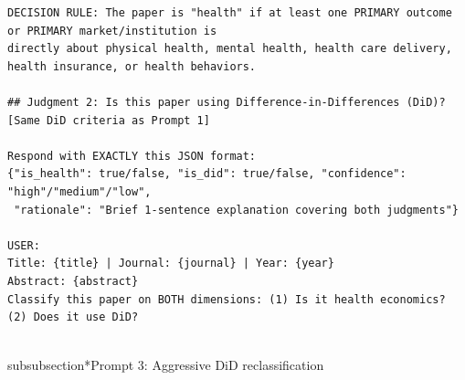 \begin{tcolorbox}[colback=gray!5, colframe=gray!60, breakable]
\begin{verbatim}
DECISION RULE: The paper is "health" if at least one PRIMARY outcome or PRIMARY market/institution is
directly about physical health, mental health, health care delivery, health insurance, or health behaviors.

## Judgment 2: Is this paper using Difference-in-Differences (DiD)?
[Same DiD criteria as Prompt 1]

Respond with EXACTLY this JSON format:
{"is_health": true/false, "is_did": true/false, "confidence": "high"/"medium"/"low",
 "rationale": "Brief 1-sentence explanation covering both judgments"}

USER:
Title: {title} | Journal: {journal} | Year: {year}
Abstract: {abstract}
Classify this paper on BOTH dimensions: (1) Is it health economics? (2) Does it use DiD?
\end{verbatim}
\end{tcolorbox}


\\subsubsection*{Prompt 3: Aggressive DiD reclassification}

